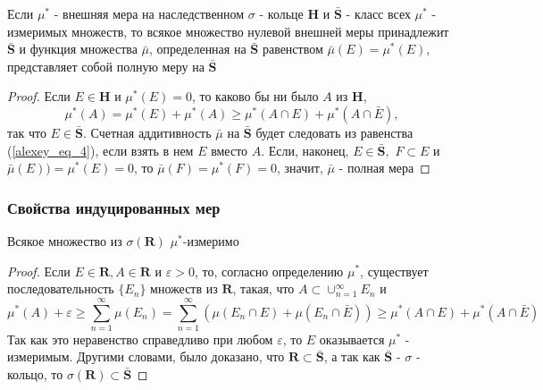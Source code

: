 \begin{theorem_sub}
\cite{HalmoshTheoryM1953}
\label{to_mu_bar}
	Если $\mu^{*}$ - внешняя мера на наследственном $\sigma$ -  кольце $\textbf{H}$ и $\bar{\textbf{S}}$ - класс всех $\mu^{*}$ - измеримых множеств, то всякое множество нулевой внешней меры принадлежит $\bar{\textbf{S}}$ и функция множества $\bar{\mu}$, определенная на $\bar{\textbf{S}}$ равенством $\bar{\mu}(E) = \mu^{*}(E)$, представляет собой полную меру на $\bar{\textbf{S}}$
\end{theorem_sub}

\begin{proof}

Если  $E \in \textbf{H}$ и $\mu^{*}(E) = 0$, то каково бы ни было $A$ из $\textbf{H}$,
$$
	\mu^{*}(A) = \mu^{*}(E) + \mu^{*}(A) \geq \mu^{*}(A \cap E) + \mu^{*}(A \cap \bar{E}),	
$$
так что $E \in \bar{\textbf{S}}$. Счетная аддитивность $\bar{\mu}$ на $\bar{\textbf{S}}$ будет следовать из равенства (\ref{alexey_eq_4}), если взять в нем $E$ вместо $A$. Если, наконец, $E \in \bar{\textbf{S}},$ $F \subset E$ и $\bar{\mu}(E)) = \mu^{*}(E) = 0$, то $\bar{\mu}(F) = \mu^{*}(F) = 0$, значит, $\bar{\mu}$ - полная мера

\end{proof}


\subsubsection{Свойства индуцированных мер}

\begin{theorem_sub}
\cite{HalmoshTheoryM1953}
\label{mu_star_measur}
Всякое множество из $\sigma(\textbf{R})$ $\mu^{*}$-измеримо
\end{theorem_sub}

\begin{proof}

Если $E \in \textbf{R}, A \in \textbf{R}$ и $\varepsilon > 0$, то, согласно определению $\mu^{*}$, существует последовательность $\{E_n\}$ множеств из $\textbf{R}$, такая, что $A \subset \cup_{n = 1}^{\infty} E_n$ и
$$
	\mu^{*}(A) + \varepsilon \geq \sum_{n = 1}^{\infty}\mu(E_n) = \sum_{n = 1}^{\infty}(\mu(E_n \cap E) + \mu(E_n \cap \bar{E})) \geq \mu^{*}(A \cap E) + \mu^{*}(A \cap \bar{E})
$$
Так как это неравенство справедливо при любом $\varepsilon$, то $E$ оказывается $\mu^{*}$ - измеримым. Другими словами, было доказано, что $\textbf{R} \subset \bar{\textbf{S}}$, а так как $\bar{\textbf{S}}$ - $\sigma$ - кольцо, то $\sigma(\textbf{R})\subset \bar{\textbf{S}}$
\end{proof}

